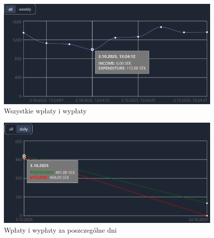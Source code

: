 \begin{frame}{\insertsection}
\begin{figure}
	\centering
	\includegraphics[width=1\linewidth]{../images/TransakcjeAll}
	\caption{Wszystkie wpłaty i wypłaty}
	\label{fig:transakcjeall}
\end{figure}
\end{frame}

\begin{frame}{\insertsection}
\begin{figure}
	\centering
	\includegraphics[width=1\linewidth]{../images/TransakcjeDaily}
	\caption{Wpłaty i wypłaty za poszczególne dni}
	\label{fig:transakcjedaily}
\end{figure}
\end{frame}
